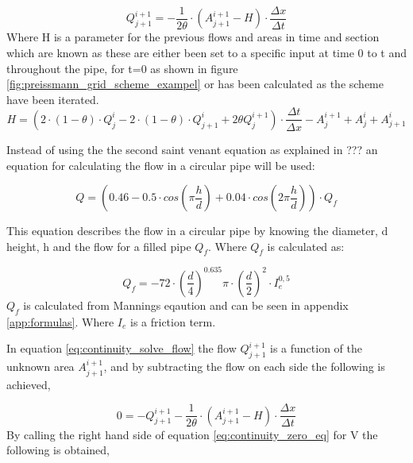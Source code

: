 \begin{equation}\label{eq:continuity_solve_flow}
	Q_{j+1}^{i+1} = - \frac{1}{2\theta}\cdot\left(A_{j+1}^{i+1}-H\right)\cdot\frac{\Delta x}{\Delta t}
\end{equation}
Where H is a parameter for the previous flows and areas in time and section which are known as these are either been set to a specific input at time 0 to t and throughout the pipe, for t=0 as shown in figure \ref{fig:preissmann_grid_scheme_exampel} or has been calculated as the scheme have been iterated.
\begin{equation}
	H = \left(2\cdot(1-\theta)\cdot Q_j^i-2\cdot(1-\theta)\cdot Q_{j+1}^i+2\theta Q_j^{i+1}\right)\cdot\frac{\Delta t}{\Delta x}- A_{j}^{i+1}+A_j^i+A_{j+1}^i
\end{equation}

Instead of using the the second saint venant equation as explained in ???  an equation for calculating the flow in a circular pipe will be used:

\begin{equation}\label{eq:calc_for_flowv2}
 	Q = \left(0.46-0.5 \cdot cos\left(\pi \frac{h}{d}\right)+0.04\cdot cos\left(2\pi\frac{h}{d}\right)\right)\cdot Q_f
\end{equation}

This equation describes the flow in a circular pipe by knowing the diameter, d height, h and the flow for a filled pipe $Q_f$. Where $Q_f$ is calculated as:

\begin{equation}\label{eq:qf_for_flow}
	Q_f =-72\cdot \left(\frac{d}{4}\right)^{0.635}\pi\cdot\left(\frac{d}{2}\right)^2\cdot I_e^{0,5}%
\end{equation}
$Q_f$ is calculated from Mannings eqaution and can be seen in appendix \ref{app:formulas}. Where $I_e$ is a friction term.   

In equation \ref{eq:continuity_solve_flow} the flow $Q_{j+1}^{i+1}$ is a function of the unknown area $A_{j+1}^{i+1}$, and by subtracting the flow on each side the following is achieved,

\begin{equation}\label{eq:continuity_zero_eq}
		0=-Q_{j+1}^{i+1}  - \frac{1}{2\theta}\cdot\left(A_{j+1}^{i+1}-H\right)\cdot \frac{\Delta x}{\Delta t}
\end{equation}
By calling the right hand side of equation \ref{eq:continuity_zero_eq} for V the following is obtained,

